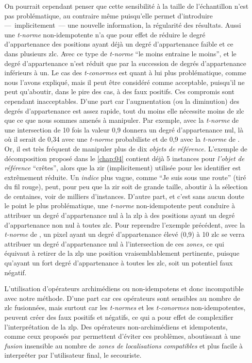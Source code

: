 On pourrait cependant penser que cette sensibilité à la taille de
l'échantillon n'est pas problématique, au contraire même puisqu'elle
permet d'introduire ---~implicitement~--- une nouvelle information, la
régularité des résultats. Aussi une \emph{t-norme} non-idempotente n'a
que pour effet de réduire le degré d'appartenance des positions ayant
déjà un degré d'appartenance faible et ce dans plusieurs
\ac{zlc}. Avec ce type de \emph{t-norme} \enquote{le moins entraine le
  moins}, et le degré d'appartenance n'est réduit que par la
succession de degrés d'appartenance inférieurs à un. Le cas des
\emph{t-conormes} est quant à lui plus problématique, comme nous
l'avons expliqué, mais il peut être considéré comme acceptable,
puisqu'il ne peut qu'aboutir, dans le pire des cas, à des faux
positifs. Ces compromis sont cependant inacceptables. D'une part car
l'augmentation (ou la diminution) des degrés d'appartenance est assez
rapide, tout du moins elle nécessite moins de \ac{zlc} que ce que nous
sommes amenés à manipuler. Par exemple, avec la \emph{t-norme} de
 une intersection de 10 fois la valeur 0,9 donnera un
degré d’appartenance nul, là où il serait de 0,34 avec une
\emph{t-norme} probabiliste et de 0,9 avec la \emph{t-norme} de
\textcite{Zadeh1965}. Or, il est très fréquent de manipuler plus de
dix \emph{objets de référence.} L'exemple de décomposition proposé
dans le \autoref{chap:04} contient déjà 5 instances pour \emph{l'objet
  de référence} \enquote{crêtes}, alors que la \ac{zir}
(implicitement) utilisée pour les identifier est extrêmement
réduite. Un \emph{indice} plus vague, comme \enquote{Je suis sous une
  route} (tiré du fil rouge), peut, pour peu que la \ac{zir} soit de
grande taille, aboutir à la sélection de centaines, voir de milliers
d'instances. D'autre part, et c'est sans aucun doute le point le plus
problématique, une \emph{t-norme} non-idempotente peut conduire à
attribuer un degré d'appartenance nul à la \ac{zlp} à des positions
ayant un degré d’appartenance non nul à toutes \ac{zlc}. Pour
reprendre l'exemple précédent, avec la \emph{t-norme} de
, un pixel ayant un degré d'appartenance élevé (0,9)
à 10 \ac{zlc} se verra attribuer un degré d'appartenance nul à
l'intersection de ces \emph{zones,} ce qui équivaut à retirer de la
\ac{zlp} une position vraisemblablement pertinente, puisque qu'ayant
un fort degré d’appartenance à toutes les \ac{zlc}, soit un potentiel
faux négatif.

L'utilisation d'opérateurs archimédiens ou non-idempotens et donc
incompatible avec notre méthode. D'une part car ces opérateurs sont
sensibles au nombre de \ac{zlc} fusionnées, mais surtout car les
\emph{t-normes} et les \emph{t-conormes} non-idempotentes, peuvent
créer des faux positifs et négatifs, ce qui a pour effet de
complexifier l'interprétation de la \ac{zlp}. Des opérateurs
non-archimédiens et idempotents, comme ceux proposés par
\textcite{Zadeh1965} permettent d'éviter ces problèmes, aboutissant à
une \emph{fusion} insensible au nombre de \emph{zones de localisations
  compatibles} et plus facile à interpréter par l'utilisateur final,
le secouriste.

